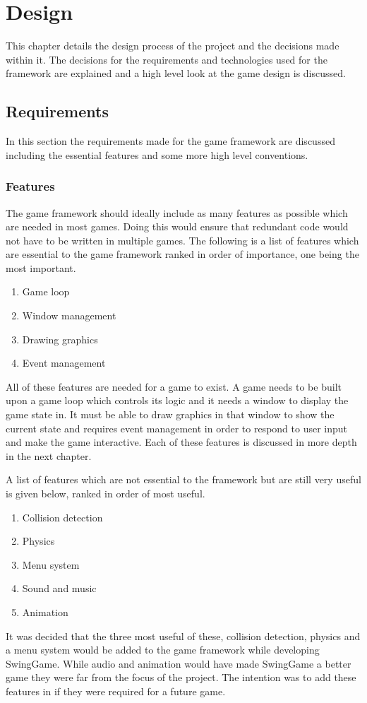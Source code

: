 \documentclass[]{report}
\begin{document}
\chapter{Design}
This chapter details the design process of the project and the decisions made within it. The decisions for the requirements and technologies used for the framework are explained and a high level look at the game design is discussed.
	\section{Requirements}
	In this section the requirements made for the game framework are discussed including the essential features and some more high level conventions.
		\subsection{Features}
		The game framework should ideally include as many features as possible which are needed in most games. Doing this would ensure that redundant code would not have to be written in multiple games. The following is a list of features which are essential to the game framework ranked in order of importance, one being the most important.
		\begin{enumerate}
			\item{Game loop}
			\item{Window management}
			\item{Drawing graphics}
			\item{Event management}
		\end{enumerate}
		All of these features are needed for a game to exist. A game needs to be built upon a game loop which controls its logic and it needs a window to display the game state in. It must be able to draw graphics in that window to show the current state and requires event management in order to respond to user input and make the game interactive. Each of these features is discussed in more depth in the next chapter.
		
		A list of features which are not essential to the framework but are still very useful is given below, ranked in order of most useful.
		\begin{enumerate}
			\item{Collision detection}
			\item{Physics}
			\item{Menu system}
			\item{Sound and music}
			\item{Animation}
		\end{enumerate}
		It was decided that the three most useful of these, collision detection, physics and a menu system would be added to the game framework while developing SwingGame. While audio and animation would have made SwingGame a better game they were far from the focus of the project. The intention was to add these features in if they were required for a future game.
		
\end{document}
